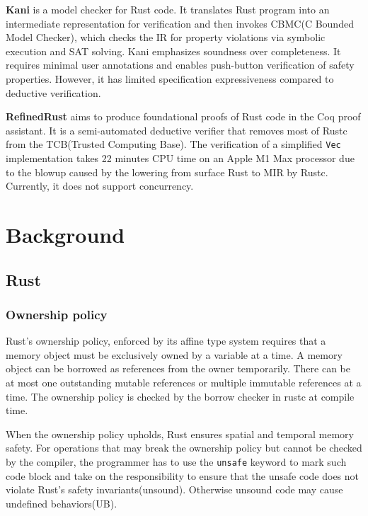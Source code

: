 \documentclass[conference]{IEEEtran}
\begin{document}
\textbf{Kani}\cite{kani} is a model checker for Rust code. It translates Rust program into an intermediate representation for verification and then invokes CBMC(C Bounded Model Checker)\cite{kroening2023cbmccboundedmodel}, which checks the IR for property violations via symbolic execution and SAT solving. Kani emphasizes soundness over completeness. It requires minimal user annotations and enables push-button verification of safety properties. However, it has limited specification expressiveness compared to deductive verification.   

\textbf{RefinedRust}\cite{RefinedRust} aims to produce foundational proofs of Rust code in the Coq proof assistant. It is a semi-automated deductive verifier that removes most of Rustc from the TCB(Trusted Computing Base). The verification of a simplified \texttt{Vec} implementation takes 22 minutes CPU time on an Apple M1 Max processor due to the blowup caused by the lowering from surface Rust to MIR by Rustc. Currently, it does not support concurrency.       




\section{Background}

\subsection{Rust}
\subsubsection{Ownership policy}
Rust's ownership policy, enforced by its affine type system requires that a memory object must be exclusively owned by a variable at a time. A memory object can be borrowed as references from the owner temporarily. There can be at most one outstanding mutable references or multiple immutable references at a time. The ownership policy is checked by the borrow checker in rustc at compile time.

When the ownership policy upholds, Rust ensures spatial and temporal memory safety. For operations that may break the ownership policy but cannot be checked by the compiler, the programmer has to use the \texttt{unsafe} keyword to mark such code block and take on the responsibility to ensure that the unsafe code does not violate Rust's safety invariants(unsound). Otherwise unsound code may cause undefined behaviors(UB).
\end{document}
